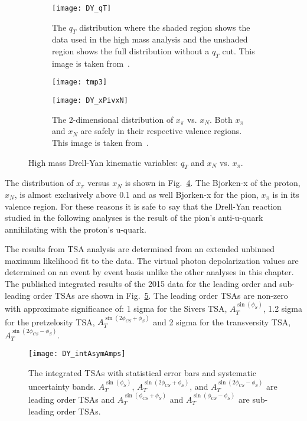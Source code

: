 \begin{figure}[h!t]
  \centering
  \begin{subfigure}{0.45\textwidth}
    \centering \texttt{[image: DY\_qT]}
    \caption{The $q_T$ distribution where the shaded region shows the data used
      in the high mass analysis and the unshaded region shows the full
      distribution without a $q_T$ cut.  This image is taken
      from~\cite{compassDYpaper}.}
    \label{fig::DY_qT}
  \end{subfigure}
  \begin{subfigure}{.02\textwidth}
    \texttt{[image: tmp3]}
    \label{fig::tmp3}%
  \end{subfigure}
    \begin{subfigure}{0.48\textwidth}
    \centering \texttt{[image: DY\_xPivxN]}
    \caption{The 2-dimensional distribution of $x_{\pi}$ vs. $x_{N}$.  Both
      $x_{\pi}$ and $x_N$ are safely in their respective valence regions.  This
      image is taken from~\cite{compassDYpaper}.}
    \label{fig::DY_xPivxN}
    \end{subfigure}
    \caption{High mass Drell-Yan kinematic variables: $q_T$ and $x_N$
      vs. $x_\pi$.}
\end{figure}

The distribution of $x_{\pi}$ versus $x_N$ is shown in
Fig.~\ref{fig::DY_xPivxN}.  The Bjorken-x of the proton, $x_N$, is almost
exclusively above 0.1 and as well Bjorken-x for the pion, $x_{\pi}$ is in its
valence region.  For these reasons it is safe to say that the Drell-Yan reaction
studied in the following analyses is the result of the pion's anti-u-quark
annihilating with the proton's u-quark.

The results from TSA analysis are determined from an extended unbinned maximum
likelihood fit to the data.  The virtual photon depolarization values are
determined on an event by event basis unlike the other analyses in this chapter.
The published integrated results of the 2015 data for the leading order and
sub-leading order TSAs are shown in Fig.~\ref{fig::DY_intAsymAmps}.  The leading
order TSAs are non-zero with approximate significance of: 1 sigma for the
Sivers TSA, $A_T^{\sin(\phi_S)}$, 1.2 sigma for the pretzelosity TSA,
$A_T^{\sin(2\phi_{CS}+\phi_S)}$ and 2 sigma for the transversity TSA,
$A_T^{\sin(2\phi_{CS}-\phi_S)}$.

\begin{figure}[h!t]
  \centering \texttt{[image: DY\_intAsymAmps]}
  \caption{The integrated TSAs with statistical error bars and systematic
    uncertainty bands.  $A_T^{\sin(\phi_S)}$, $A_T^{\sin(2\phi_{CS}+\phi_S)}$,
    and $A_T^{\sin(2\phi_{CS}-\phi_S)}$ are leading order TSAs and
    $A_T^{\sin(\phi_{CS}+\phi_S)}$ and $A_T^{\sin(\phi_{CS}-\phi_S)}$ are
    sub-leading order TSAs.}
  \label{fig::DY_intAsymAmps}
\end{figure}

